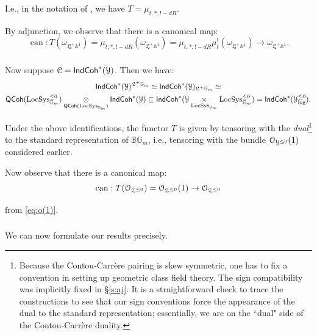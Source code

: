\documentclass[reqno,11pt]{amsart}
\numberwithin{equation}{subsection}
\theoremstyle{remark}
\newcommand{\bA}{{\mathbb A}}
\newcommand{\bB}{{\mathbb B}}
\newcommand{\bG}{{\mathbb G}}
\newcommand{\sC}{{\EuScript C}}
\newcommand{\sO}{{\EuScript O}}
\newcommand{\sY}{{\EuScript Y}}
\newcommand{\sZ}{{\EuScript Z}}
\newcommand{\fL}{{\mathfrak L}}
\newcommand{\on}{\operatorname}
\newcommand{\LocSys}{\on{LocSys}}
\newcommand{\IndCoh}{\mathsf{IndCoh}}
\newcommand{\QCoh}{\mathsf{QCoh}}
\renewcommand{\subset}{\subseteq}
\begin{document}
\noindent I.e., in the notation of \cite{dmod}, we have $T = \mu_{t,*,!-dR}$.

By adjunction, we observe that there is a canonical map:
%
\begin{equation}\label{eq:can-unit-geom}
\on{can}:T(\omega_{\fL^+\bA^1}) = \mu_{t,*,!-dR}(\omega_{\fL^+\bA^1}) = 
\mu_{t,*,!-dR}\mu_t^!(\omega_{\fL^+\bA^1}) \to 
\omega_{\fL^+\bA^1}.
\end{equation}

\subsubsection{}

Now suppose $\sC = \IndCoh^*(\sY)$. Then we have:
%
\[
\begin{gathered}
\IndCoh^*(\sY)^{\fL^+\bG_m} \simeq \IndCoh^*(\sY)_{\fL^+\bG_m} \simeq \\
\QCoh(\LocSys_{\bG_m}^{\leq 0}) \underset{\QCoh(\LocSys_{\bG_m})}{\otimes}
\IndCoh^*(\sY) \subset 
\IndCoh^*(\sY \underset{\LocSys_{\bG_m}}{\times} \LocSys_{\bG_m}^{\leq 0}) = 
\IndCoh^*(\sY_{\log}^{\leq 0}).
\end{gathered}
\]

Under the above
identifications, the functor $T$ is given by tensoring with 
the \emph{dual}\footnote{Because the Contou-Carr\`ere pairing
is skew symmetric, one has to fix a convention in setting up geometric
class field theory. The sign compatibility was implicitly fixed in 
\S \ref{s:aj}. It is a straightforward check to trace the constructions
to see that our sign conventions force the appearance of the dual to the
standard representation; essentially, we are on the ``dual" side of the
Contou-Carr\`ere duality.}
to the standard representation of $\bB \bG_m$, i.e., tensoring with the
bundle $\sO_{\sY^{\leq 0}}(1)$ considered earlier.

Now observe that there is a canonical map:
%
\begin{equation}\label{eq:can-unit-spec}
\on{can}:T(\sO_{\sZ^{\leq 0}}) = 
\sO_{\sZ^{\leq 0}}(1) \to \sO_{\sZ^{\leq 0}}
\end{equation}

\noindent from \eqref{eq:o(1)}.

\subsubsection{}

We can now formulate our results precisely. 
\end{document}
